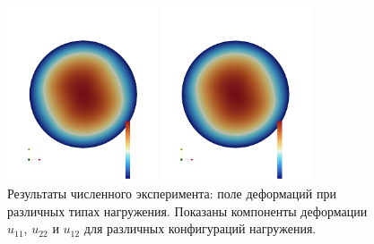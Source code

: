 



\begin{figure}[htbp]
\centering
\includegraphics[width=0.8\textwidth]{img/bx_inf_u.png}
\caption{Результаты численного эксперимента: поле деформаций при различных типах нагружения. Показаны компоненты деформации $u_{11}$, $u_{22}$ и $u_{12}$ для различных конфигураций нагружения.}
\label{fig:numerical_deformations}
\end{figure}

